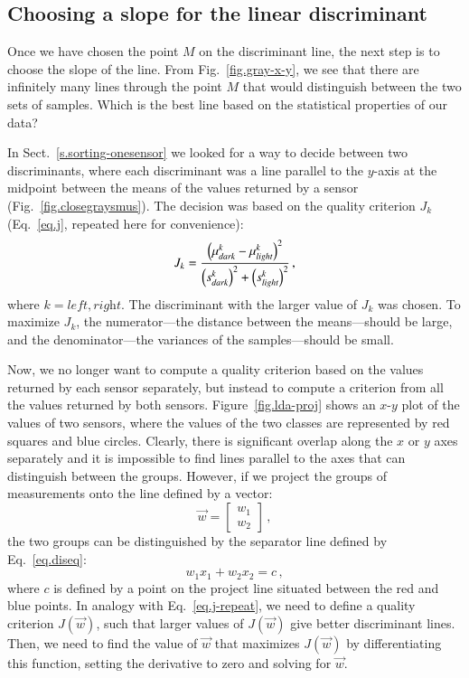 \subsection{Choosing a slope for the linear discriminant}

Once we have chosen the point $M$ on the discriminant line, the next step is to choose the slope of the line. From Fig.~\ref{fig.gray-x-y}, we see that there are infinitely many lines through the point $M$ that would distinguish between the two sets of samples. Which is the best line based on the statistical properties of our data?

In Sect.~\ref{s.sorting-onesensor} we looked for a way to decide between two discriminants, where each discriminant was a line parallel to the $y$-axis at the midpoint between the means of the values returned by a sensor (Fig.~\ref{fig.closegraysmus}). The decision was based on the quality criterion $J_k$ (Eq.~\ref{eq.j}, repeated here for convenience):
\begin{equation}
J_k = \frac{\left(\mu_{\textit{\scriptsize dark}}^k - \mu_{\textit{\scriptsize light}}^k\right)^2}{\left(s_{\textit{\scriptsize dark}}^k\right)^2 + \left(s_{\textit{\scriptsize light}}^k\right)^2}\,,\label{eq.j-repeat}
\end{equation}
where $k=\textit{left},\textit{right}$. The discriminant with the larger value of $J_k$ was chosen. To maximize $J_k$, the numerator---the distance between the means---should be large, and the denominator---the variances of the samples---should be small.

Now, we no longer want to compute a quality criterion based on the values returned by each sensor separately, but instead to compute a criterion from all the values returned by both sensors. Figure~\ref{fig.lda-proj} shows an $x$-$y$ plot of the values of two sensors, where the values of the two classes are represented by red squares and blue circles. Clearly, there is significant overlap along the $x$ or $y$ axes separately and it is impossible to find lines parallel to the axes that can distinguish between the groups. However, if we project the groups of measurements onto the line defined by a vector:
\[
\vec{w} = \left[\begin{array}{c}w_1\\w_2\end{array}\right]\,,
\]
the two groups can be distinguished by the separator line defined by Eq.~\ref{eq.diseq}:
\[
w_1x_1 + w_2x_2 = c\,,
\]
where $c$ is defined by a point on the project line situated between the red and blue points. In analogy with Eq.~\ref{eq.j-repeat}, we need to define a quality criterion $J(\vec{w})$, such that larger values of $J(\vec{w})$ give better discriminant lines. Then, we need to find the value of $\vec{w}$ that maximizes $J(\vec{w})$ by differentiating this function, setting the derivative to zero and solving for $\vec{w}$.

